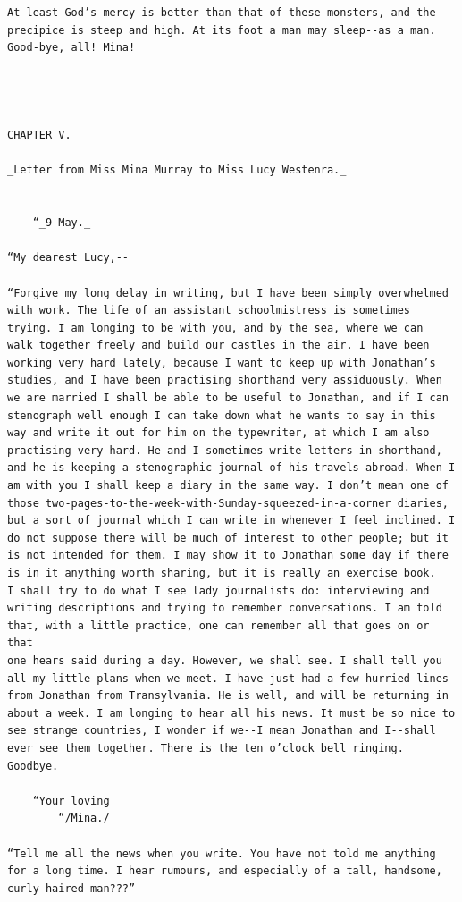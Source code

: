 \documentclass{article}
\begin{document}
\begin{verbatim}
At least God’s mercy is better than that of these monsters, and the
precipice is steep and high. At its foot a man may sleep--as a man.
Good-bye, all! Mina!




CHAPTER V.

_Letter from Miss Mina Murray to Miss Lucy Westenra._


    “_9 May._

“My dearest Lucy,--

“Forgive my long delay in writing, but I have been simply overwhelmed
with work. The life of an assistant schoolmistress is sometimes
trying. I am longing to be with you, and by the sea, where we can
walk together freely and build our castles in the air. I have been
working very hard lately, because I want to keep up with Jonathan’s
studies, and I have been practising shorthand very assiduously. When
we are married I shall be able to be useful to Jonathan, and if I can
stenograph well enough I can take down what he wants to say in this
way and write it out for him on the typewriter, at which I am also
practising very hard. He and I sometimes write letters in shorthand,
and he is keeping a stenographic journal of his travels abroad. When I
am with you I shall keep a diary in the same way. I don’t mean one of
those two-pages-to-the-week-with-Sunday-squeezed-in-a-corner diaries,
but a sort of journal which I can write in whenever I feel inclined. I
do not suppose there will be much of interest to other people; but it
is not intended for them. I may show it to Jonathan some day if there
is in it anything worth sharing, but it is really an exercise book.
I shall try to do what I see lady journalists do: interviewing and
writing descriptions and trying to remember conversations. I am told
that, with a little practice, one can remember all that goes on or that
one hears said during a day. However, we shall see. I shall tell you
all my little plans when we meet. I have just had a few hurried lines
from Jonathan from Transylvania. He is well, and will be returning in
about a week. I am longing to hear all his news. It must be so nice to
see strange countries, I wonder if we--I mean Jonathan and I--shall
ever see them together. There is the ten o’clock bell ringing. Goodbye.

    “Your loving
        “/Mina./

“Tell me all the news when you write. You have not told me anything
for a long time. I hear rumours, and especially of a tall, handsome,
curly-haired man???”



\end{verbatim}
\end{document}
